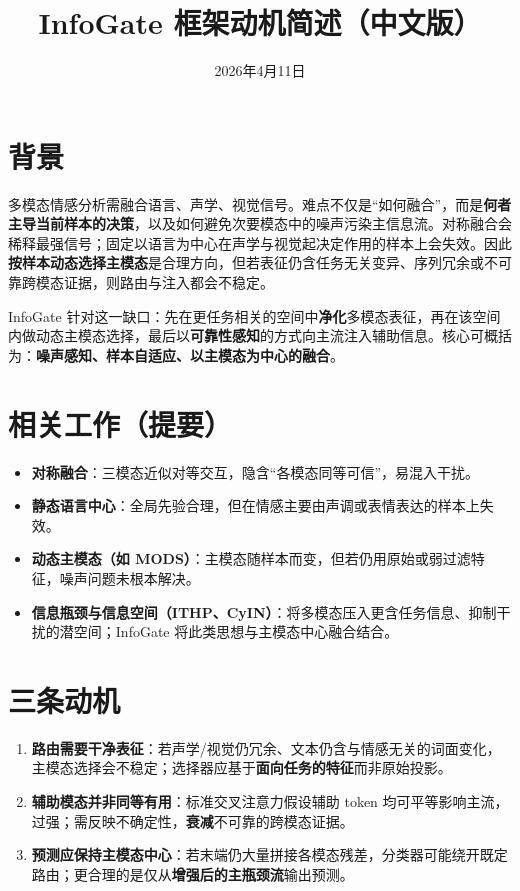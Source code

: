 \documentclass[11pt]{article}
\title{InfoGate 框架动机简述（中文版）}
\author{}
\date{2026年4月11日}
\begin{document}
\maketitle

\section{背景}

多模态情感分析需融合语言、声学、视觉信号。难点不仅是``如何融合''，而是\textbf{何者主导当前样本的决策}，以及如何避免次要模态中的噪声污染主信息流。对称融合会稀释最强信号；固定以语言为中心在声学与视觉起决定作用的样本上会失效。因此\textbf{按样本动态选择主模态}是合理方向，但若表征仍含任务无关变异、序列冗余或不可靠跨模态证据，则路由与注入都会不稳定。

InfoGate 针对这一缺口：先在更任务相关的空间中\textbf{净化}多模态表征，再在该空间内做动态主模态选择，最后以\textbf{可靠性感知}的方式向主流注入辅助信息。核心可概括为：\textbf{噪声感知、样本自适应、以主模态为中心的融合}。

\section{相关工作（提要）}

\begin{itemize}
  \item \textbf{对称融合}：三模态近似对等交互，隐含``各模态同等可信''，易混入干扰。
  \item \textbf{静态语言中心}：全局先验合理，但在情感主要由声调或表情表达的样本上失效。
  \item \textbf{动态主模态（如 MODS）}：主模态随样本而变，但若仍用原始或弱过滤特征，噪声问题未根本解决。
  \item \textbf{信息瓶颈与信息空间（ITHP、CyIN）}：将多模态压入更含任务信息、抑制干扰的潜空间；InfoGate 将此类思想与主模态中心融合结合。
\end{itemize}

\section{三条动机}

\begin{enumerate}
  \item \textbf{路由需要干净表征}：若声学/视觉仍冗余、文本仍含与情感无关的词面变化，主模态选择会不稳定；选择器应基于\textbf{面向任务的特征}而非原始投影。
  \item \textbf{辅助模态并非同等有用}：标准交叉注意力假设辅助 token 均可平等影响主流，过强；需反映不确定性，\textbf{衰减}不可靠的跨模态证据。
  \item \textbf{预测应保持主模态中心}：若末端仍大量拼接各模态残差，分类器可能绕开既定路由；更合理的是仅从\textbf{增强后的主瓶颈流}输出预测。
\end{enumerate}
\end{document}
